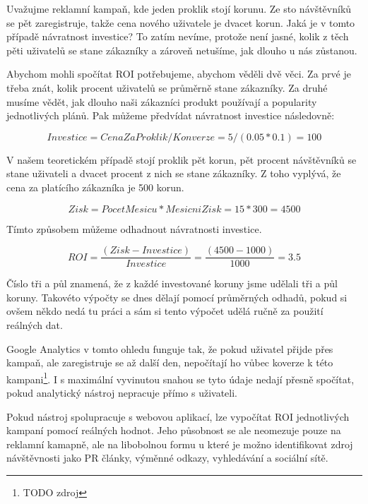\documentclass[bc,female,java,dept456]{diploma}						%
\begin{document}
Uvažujme reklamní kampaň, kde jeden proklik stojí korunu. Ze sto návštěvníků se pět zaregistruje, takže cena nového uživatele je dvacet korun. Jaká je v tomto případě návratnost investice? To zatím nevíme, protože není jasné, kolik z těch pěti uživatelů se stane zákazníky a zároveň netušíme, jak dlouho u nás zůstanou.

Abychom mohli spočítat ROI potřebujeme, abychom věděli dvě věci. Za prvé je třeba znát, kolik procent uživatelů se průměrně stane zákazníky. Za druhé musíme vědět, jak dlouho naši zákazníci produkt používají a popularity jednotlivých plánů. Pak můžeme předvídat návratnost investice následovně:


\begin{equation}\label{eq:roi2}
Investice = CenaZaProklik / Konverze = 5 / (0.05 * 0.1) = 100
\end{equation}

V našem teoretickém případě stojí proklik pět korun, pět procent návštěvníků se stane uživateli a dvacet procent z nich se stane zákazníky. Z toho vyplývá, že cena za platícího zákazníka je 500 korun.


\begin{equation}\label{eq:roi3}
Zisk = PocetMesicu * MesicniZisk = 15 * 300 = 4500
\end{equation}

Tímto způsobem můžeme odhadnout návratnosti investice.

\begin{equation}\label{eq:roi4}
ROI = \frac{(Zisk - Investice)}{Investice} = \frac{(4500 - 1000)}{1000} = 3.5
\end{equation}

Číslo tři a půl znamená, že z každé investované koruny jsme udělali tři a půl koruny. Takovéto výpočty se dnes dělají pomocí průměrných odhadů, pokud si ovšem někdo nedá tu práci a sám si tento výpočet udělá ručně za použití reálných dat.

Google Analytics v tomto ohledu funguje tak, že pokud uživatel přijde přes kampaň, ale zaregistruje se až další den, nepočítají ho vůbec koverze k této kampani\footnote{TODO zdroj}. I s maximální vyvinutou snahou se tyto údaje nedají přesně spočítat, pokud analytický nástroj nepracuje přímo s uživateli.

Pokud nástroj spolupracuje s webovou aplikací, lze vypočítat ROI jednotlivých kampaní pomocí reálných hodnot. Jeho působnost se ale neomezuje pouze na reklamní kamapně, ale na libobolnou formu u které je možno identifikovat zdroj návštěvnosti jako PR články, výměnné odkazy, vyhledávání a sociální sítě.
\end{document}

